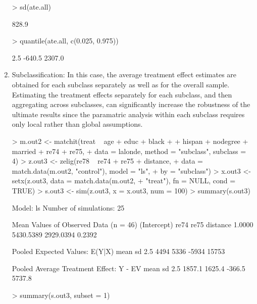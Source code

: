 \begin{enumerate}
\begin{Schunk}
\begin{Soutput}
\end{Soutput}
\begin{Sinput}
> sd(ate.all)
\end{Sinput}
\begin{Soutput}
[1] 828.9

\end{Soutput}
\begin{Sinput}
> quantile(ate.all, c(0.025, 0.975))
\end{Sinput}
\begin{Soutput}
  2.5%  97.5% 
-640.5 2307.0 

\end{Soutput}
\end{Schunk}
  
\item Subclassification: In this case, the average treatment effect
  estimates are obtained for each subclass separately as well as for
  the overall sample.  Estimating the treatment effects separately for
  each subclass, and then aggregating across subclasses, can
  significantly increase the robustness of the ultimate results since
  the paramatric analysis within each subclass requires only local
  rather than global assumptions.

\begin{Schunk}
\begin{Sinput}
> m.out2 <- matchit(treat ~ age + educ + black + 
+     hispan + nodegree + married + re74 + re75, 
+     data = lalonde, method = "subclass", subclass = 4)
> z.out3 <- zelig(re78 ~ re74 + re75 + distance, 
+     data = match.data(m.out2, "control"), model = "ls", 
+     by = "subclass")
> x.out3 <- setx(z.out3, data = match.data(m.out2, 
+     "treat"), fn = NULL, cond = TRUE)
> s.out3 <- sim(z.out3, x = x.out3, num = 100)
> summary(s.out3)
\end{Sinput}
\begin{Soutput}

  Model: ls 
  Number of simulations: 25 

Mean Values of Observed Data (n = 46) 
(Intercept)        re74        re75    distance 
     1.0000   5430.5389   2929.0394      0.2392 

Pooled Expected Values: E(Y|X)
 mean    sd  2.5% 97.5% 
 4494  5336 -5934 15753 

Pooled Average Treatment Effect: Y - EV
  mean     sd   2.5%  97.5% 
1857.1 1625.4 -366.5 5737.8 

\end{Soutput}
\begin{Sinput}
> summary(s.out3, subset = 1)
\end{Sinput}
\begin{Soutput}


\end{Soutput}
\end{Schunk}
\end{enumerate}
